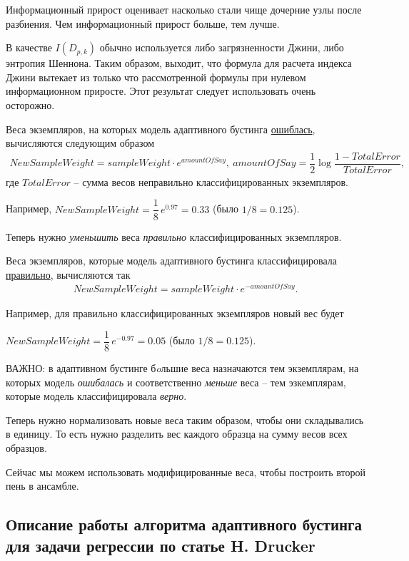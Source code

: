 \documentclass[%
	11pt,
	a4paper,
	utf8,
		]{article}
\begin{document}
Информационный прирост оценивает насколько стали чище дочерние узлы после разбиения. Чем информационный прирост больше, тем лучше.

В качестве $ I(D_{p,k}) $ обычно используется либо загрязненности Джини, либо энтропия Шеннона. Таким образом, выходит, что формула для расчета индекса Джини вытекает из только что рассмотренной формулы при нулевом информационном приросте. {\color{red} Этот результат следует использовать очень осторожно}.

Веса экземпляров, на которых модель адаптивного бустинга \underline{ошиблась}, вычисляются следующим образом
\begin{align*}
	NewSampleWeight = sampleWeight \cdot e^{amountOfSay}, \ amountOfSay = \dfrac{1}{2} \log \dfrac{ 1 - TotalError }{TotalError},
\end{align*}
где $ TotalError $ -- сумма весов неправильно классифицированных экземпляров.

Например, $ NewSampleWeight = \dfrac{1}{8}\, e^{0.97} = 0.33 $ (было $ 1/8 = 0.125 $).

Теперь нужно \emph{уменьшить} веса \emph{правильно} классифицированных экземпляров.

Веса экземпляров, которые модель адаптивного бустинга классифицировала \underline{правильно}, вычисляются так
\begin{align*}
	NewSampleWeight = sampleWeight \cdot e^{-amountOfSay}.
\end{align*}

Например, для правильно классифицированных экземпляров новый вес будет

$ NewSampleWeight = \dfrac{1}{8} \, e^{-0.97} = 0.05 $ (было $ 1/8 = 0.125 $).

ВАЖНО: в адаптивном бустинге б\emph{o}льшие веса назначаются тем экземплярам, на которых модель \emph{ошибалась} и соответственно \emph{меньше} веса -- тем эзкемплярам, которые модель классифицировала \emph{верно}.

{\color{blue}Теперь нужно нормализовать новые веса таким образом, чтобы они складывались в единицу. То есть нужно разделить вес каждого образца на сумму весов всех образцов.}

Сейчас мы можем использовать модифицированные веса, чтобы построить второй пень в ансамбле.

\subsection{Описание работы алгоритма адаптивного бустинга для задачи регрессии по статье H. Drucker~\cite{drucker:adaboost-1997}}
\end{document}
